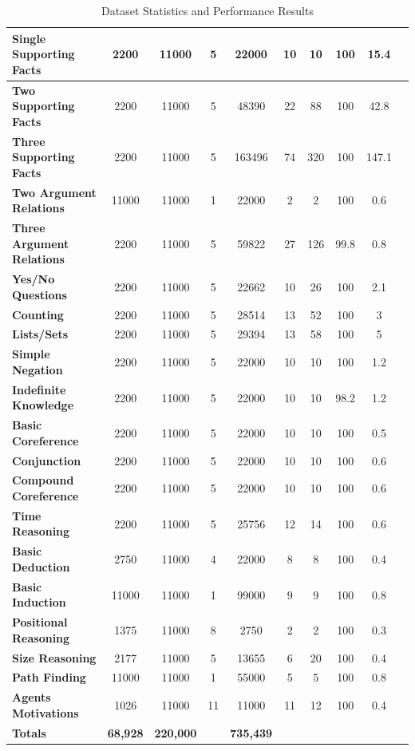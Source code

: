 \documentclass[letterpaper]{article}
\begin{document}
\begin{table}[b]
\begin{tabular}{|l||*{9}{c|}}
\textbf{\cellcolor{green!20}Single Supporting Facts} & 2200 & 11000 & 5 & 22000 & 10 & 10 & 100 & 15.4  \\\hline
\textbf{\cellcolor{green!20}Two Supporting Facts} & 2200 & 11000 &  5 & 48390 & 22 & 88 & 100 & 42.8\\\hline
\textbf{\cellcolor{green!20}Three Supporting Facts} & 2200 & 11000 & 5 & 163496 & 74 & 320 & 100 & 147.1\\\hline
\textbf{\cellcolor{green!20}Two Argument Relations} & 11000 & 11000  & 1 & 22000 & 2 & 2 & 100 & 0.6\\\hline
\textbf{\cellcolor{green!20}Three Argument Relations} & 2200 & 11000 & 5 & 59822 & 27 & 126 & 99.8 & 0.8\\\hline
\textbf{\cellcolor{green!20}Yes/No Questions} & 2200 & 11000 & 5 & 22662 & 10 & 26 & 100 & 2.1\\\hline
\textbf{\cellcolor{green!20}Counting} & 2200 & 11000 & 5 & 28514 & 13 & 52 & 100 & 3\\\hline
\textbf{\cellcolor{green!20}Lists/Sets} & 2200 & 11000 & 5 & 29394 & 13 & 58 & 100 & 5\\\hline
\textbf{\cellcolor{green!20}Simple Negation}  & 2200 & 11000 & 5 & 22000 & 10 & 10 & 100 & 1.2\\\hline
\textbf{\cellcolor{green!20}Indefinite Knowledge} & 2200 & 11000 & 5 & 22000  & 10 & 10 & 98.2 & 1.2\\\hline
\textbf{\cellcolor{green!20}Basic Coreference} & 2200 & 11000 & 5 & 22000 & 10 & 10  & 100 & 0.5\\\hline
\textbf{\cellcolor{green!20}Conjunction} & 2200 & 11000  & 5 & 22000 & 10 & 10 & 100 & 0.6\\\hline
\textbf{\cellcolor{green!20}Compound Coreference} & 2200 & 11000 & 5 & 22000 & 10 & 10 & 100 & 0.6\\\hline
\textbf{\cellcolor{green!20}Time Reasoning} & 2200 & 11000  & 5 & 25756 & 12 & 14 & 100 & 0.6\\\hline
\textbf{\cellcolor{green!20}Basic Deduction} & 2750 & 11000 & 4 & 22000 & 8 & 8 & 100 & 0.4\\\hline
\textbf{\cellcolor{green!20}Basic Induction} & 11000 & 11000 & 1 & 99000 & 9 & 9 & 100 & 0.8\\\hline
\textbf{\cellcolor{green!20}Positional Reasoning} & 1375 & 11000 & 8 & 2750 & 2 & 2 & 100 & 0.3\\\hline
\textbf{\cellcolor{green!20}Size Reasoning} & 2177 & 11000 & 5 & 13655 & 6 & 20 & 100 & 0.4\\\hline
\textbf{\cellcolor{green!20}Path Finding} & 11000 & 11000 & 1 & 55000 & 5 & 5 & 100 & 0.8\\\hline
\textbf{\cellcolor{green!20}Agents Motivations} & 1026 & 11000 & 11 & 11000 & 11 & 12 & 100 & 0.4\\\hline
\textbf{\cellcolor{orange!20}\textbf{Totals}} & \textbf{68,928} & \textbf{220,000} &  & \textbf{735,439} &  &  &  & \\\hline
\end{tabular}
\vspace{0.02in}
\caption{Dataset Statistics and Performance Results}
\label{table:square_performance_result}
\end{table}
\end{document}
